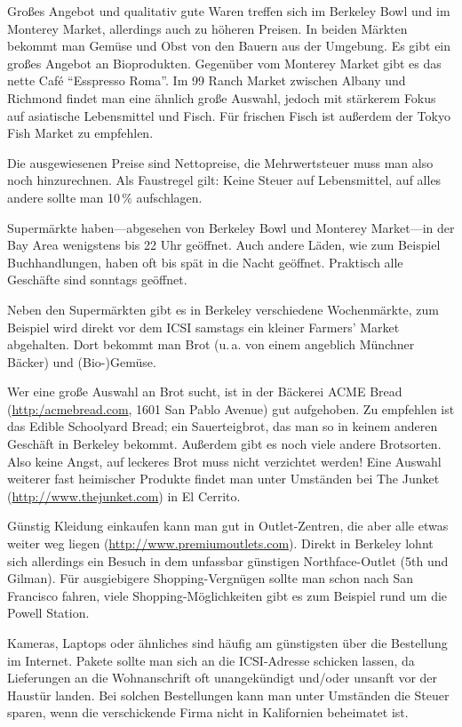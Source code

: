 \documentclass[a4paper]{scrreprt}
\begin{document}
Großes Angebot und qualitativ gute Waren treffen sich im Berkeley Bowl
und im Monterey Market, allerdings auch zu höheren Preisen. In beiden
Märkten bekommt man Gemüse und Obst von den Bauern aus der
Umgebung. Es gibt ein großes Angebot an Bioprodukten. Gegenüber vom
Monterey Market gibt es das nette Café ``Esspresso Roma''. Im 99 Ranch Market zwischen Albany und Richmond findet man eine ähnlich große Auswahl, jedoch mit stärkerem Fokus auf asiatische Lebensmittel und Fisch. Für frischen Fisch ist außerdem der Tokyo Fish Market zu empfehlen.

Die ausgewiesenen Preise sind Nettopreise, die Mehrwertsteuer muss man
also noch hinzurechnen. Als Faustregel gilt: Keine Steuer auf
Lebensmittel, auf alles andere sollte man 10\,\% aufschlagen.

Supermärkte haben---abgesehen von Berkeley Bowl und Monterey Market---in der Bay Area wenigstens bis 22 Uhr geöffnet. Auch
andere Läden, wie zum Beispiel Buchhandlungen, haben oft bis spät in
die Nacht geöffnet. Praktisch alle Geschäfte sind sonntags geöffnet.

Neben den Supermärkten gibt es in Berkeley verschiedene Wochenmärkte,
zum Beispiel wird direkt vor dem ICSI samstags ein kleiner Farmers'
Market abgehalten. Dort bekommt man Brot (u.\,a. von einem angeblich
Münchner Bäcker) und (Bio-)Gemüse. %

Wer eine große Auswahl an Brot sucht, ist in der Bäckerei ACME Bread
(\url{http:/acmebread.com}, 1601 San Pablo Avenue) gut aufgehoben. Zu
empfehlen ist das Edible Schoolyard Bread; ein Sauerteigbrot, das man
so in keinem anderen Geschäft in Berkeley bekommt. Außerdem gibt es
noch viele andere Brotsorten. Also keine Angst, auf
leckeres Brot muss nicht verzichtet werden! Eine Auswahl weiterer fast heimischer Produkte findet man unter Umständen bei The Junket (\url{http://www.thejunket.com}) in El Cerrito.

Günstig Kleidung einkaufen kann man gut in Outlet-Zentren, die aber
alle etwas weiter weg liegen
(\url{http://www.premiumoutlets.com}). Direkt in Berkeley lohnt sich allerdings ein Besuch in dem unfassbar günstigen Northface-Outlet (5th und Gilman). Für ausgiebigere
Shopping-Vergnügen sollte man schon nach San Francisco fahren, viele
Shopping-Möglichkeiten gibt es zum Beispiel rund um die Powell
Station.

Kameras, Laptops oder ähnliches sind häufig am günstigsten über die
Bestellung im Internet. Pakete sollte man sich an die ICSI-Adresse
schicken lassen, da Lieferungen an die Wohnanschrift oft unangekündigt
und/oder unsanft vor der Haustür landen. Bei solchen Bestellungen kann
man unter Umständen die Steuer sparen, wenn die verschickende Firma
nicht in Kalifornien beheimatet ist.
\end{document}
